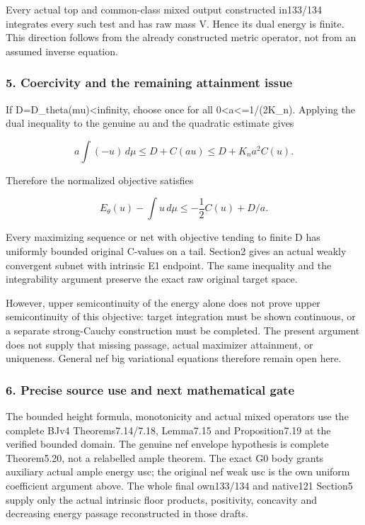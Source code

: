 \documentclass[
  10pt,
]{article}
\begin{document}
Every actual top and common-class mixed output constructed in133/134
integrates every such test and has raw mass V. Hence its dual energy is
finite. This direction follows from the already constructed metric
operator, not from an assumed inverse equation.

\subsubsection{5. Coercivity and the remaining attainment
issue}\label{coercivity-and-the-remaining-attainment-issue}

If D=D\_theta(mu)\textless infinity, choose once for all
0\textless a\textless=1/(2K\_n). Applying the dual inequality to the
genuine au and the quadratic estimate gives

\[a\int(-u)\,d\mu\le D+C(au)
\le D+K_n a^2 C(u).\]

Therefore the normalized objective satisfies

\[E_\theta(u)-\int u\,d\mu
\le-\frac12 C(u)+D/a.\]

Every maximizing sequence or net with objective tending to finite D has
uniformly bounded original C-values on a tail. Section2 gives an actual
weakly convergent subnet with intrinsic E1 endpoint. The same inequality
and the integrability argument preserve the exact raw original target
space.

However, upper semicontinuity of the energy alone does not prove upper
semicontinuity of this objective: target integration must be shown
continuous, or a separate strong-Cauchy construction must be completed.
The present argument does not supply that missing passage, actual
maximizer attainment, or uniqueness. General nef big variational
equations therefore remain open here.

\subsubsection{6. Precise source use and next mathematical
gate}\label{precise-source-use-and-next-mathematical-gate}

The bounded height formula, monotonicity and actual mixed operators use
the complete BJv4 Theorems7.14/7.18, Lemma7.15 and Proposition7.19 at
the verified bounded domain. The genuine nef envelope hypothesis is
complete Theorem5.20, not a relabelled ample theorem. The exact G0 body
grants auxiliary actual ample energy usc; the original nef weak usc is
the own uniform coefficient argument above. The whole final own133/134
and native121 Section5 supply only the actual intrinsic floor products,
positivity, concavity and decreasing energy passage reconstructed in
those drafts.
\end{document}
